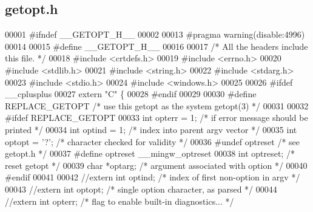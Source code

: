 \subsection{getopt.\+h}
\label{limesuite-dev_2external_2msvc_2getopt_8h_source}

\begin{DoxyCode}
00001 \textcolor{preprocessor}{#ifndef \_\_GETOPT\_H\_\_}
00002 
00013 \textcolor{preprocessor}{#pragma warning(disable:4996)}
00014 
00015 \textcolor{preprocessor}{#define \_\_GETOPT\_H\_\_}
00016 
00017 \textcolor{comment}{/* All the headers include this file. */}
00018 \textcolor{preprocessor}{#include <crtdefs.h>}
00019 \textcolor{preprocessor}{#include <errno.h>}
00020 \textcolor{preprocessor}{#include <stdlib.h>}
00021 \textcolor{preprocessor}{#include <string.h>}
00022 \textcolor{preprocessor}{#include <stdarg.h>}
00023 \textcolor{preprocessor}{#include <stdio.h>}
00024 \textcolor{preprocessor}{#include <windows.h>}
00025 
00026 \textcolor{preprocessor}{#ifdef \_\_cplusplus}
00027 \textcolor{keyword}{extern} \textcolor{stringliteral}{"C"} \{
00028 \textcolor{preprocessor}{#endif}
00029 
00030 \textcolor{preprocessor}{#define REPLACE\_GETOPT      }\textcolor{comment}{/* use this getopt as the system getopt(3) */}\textcolor{preprocessor}{}
00031 
00032 \textcolor{preprocessor}{#ifdef REPLACE\_GETOPT}
00033 \textcolor{keywordtype}{int} opterr = 1;     \textcolor{comment}{/* if error message should be printed */}
00034 \textcolor{keywordtype}{int} optind = 1;     \textcolor{comment}{/* index into parent argv vector */}
00035 \textcolor{keywordtype}{int} optopt = \textcolor{charliteral}{'?'};       \textcolor{comment}{/* character checked for validity */}
00036 \textcolor{preprocessor}{#undef  optreset        }\textcolor{comment}{/* see getopt.h */}\textcolor{preprocessor}{}
00037 \textcolor{preprocessor}{#define optreset        \_\_mingw\_optreset}
00038 \textcolor{keywordtype}{int} optreset;       \textcolor{comment}{/* reset getopt */}
00039 \textcolor{keywordtype}{char}    *optarg;        \textcolor{comment}{/* argument associated with option */}
00040 \textcolor{preprocessor}{#endif}
00041 
00042 \textcolor{comment}{//extern int optind;        /* index of first non-option in argv      */}
00043 \textcolor{comment}{//extern int optopt;        /* single option character, as parsed     */}
00044 \textcolor{comment}{//extern int opterr;        /* flag to enable built-in diagnostics... */}

\end{DoxyCode}
